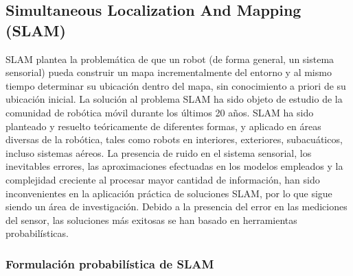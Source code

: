 \subsection{Simultaneous Localization And Mapping (SLAM)}

SLAM plantea la problemática de que un robot (de forma general, un sistema sensorial) pueda construir un mapa incrementalmente del entorno y al mismo tiempo determinar su ubicación dentro del mapa, sin conocimiento a priori de su ubicación inicial. La solución al problema SLAM ha sido objeto de estudio de la comunidad de robótica móvil durante los últimos 20 años. SLAM ha sido planteado y resuelto teóricamente de diferentes formas, y aplicado en áreas diversas de la robótica, tales como robots en interiores, exteriores, subacuáticos, incluso sistemas aéreos. La presencia de ruido en el sistema sensorial, los inevitables errores, las aproximaciones efectuadas en los modelos empleados y la complejidad creciente al procesar mayor cantidad de información, han sido inconvenientes en la aplicación práctica de soluciones SLAM, por lo que sigue siendo un área de investigación. Debido a la presencia del error en las mediciones del sensor, las soluciones más exitosas se han basado en herramientas probabilísticas.

\subsubsection{Formulación probabilística de SLAM}

